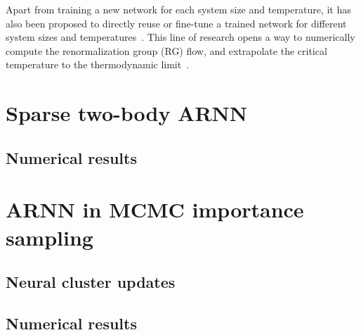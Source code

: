 Apart from training a new network for each system size and temperature, it has also been proposed to directly reuse or fine-tune a trained network for different system sizes and temperatures~\cite{efthymiou2019super, mills2019extensive, rende2024fine}. This line of research opens a way to numerically compute the renormalization group (RG) flow, and extrapolate the critical temperature to the thermodynamic limit~\cite{ron2002inverse}.

\section{Sparse two-body ARNN}

\cite{pan2021solving}

\cite{biazzo2024sparse}

\subsection{Numerical results}

\section{ARNN in MCMC importance sampling}
\label{sec:arnn-mcmc}

\cite{nicoli2020asymptotically}

\cite{ciarella2023machine}

\subsection{Neural cluster updates}
\label{sec:ncus}

\cite{wu2021unbiased}

\subsection{Numerical results}

